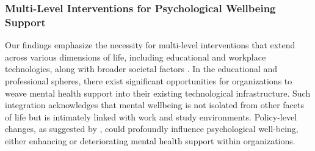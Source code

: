 
\subsubsection{Multi-Level Interventions for Psychological Wellbeing Support}


Our findings emphasize the necessity for multi-level interventions that extend across various dimensions of life, including educational and workplace technologies, along with broader societal factors \cite{sallis2015ecological, scholmerich2016translating, bauer2022community, murnane2018personal}. In the educational and professional spheres, there exist  significant opportunities for organizations to weave mental health support into their existing technological infrastructure. Such integration acknowledges that mental wellbeing is not isolated from other facets of life but is intimately linked with work and study environments. Policy-level changes, as suggested by \citet{murnane2018personal}, could profoundly influence psychological well-being, either enhancing or deteriorating mental health support within organizations.

